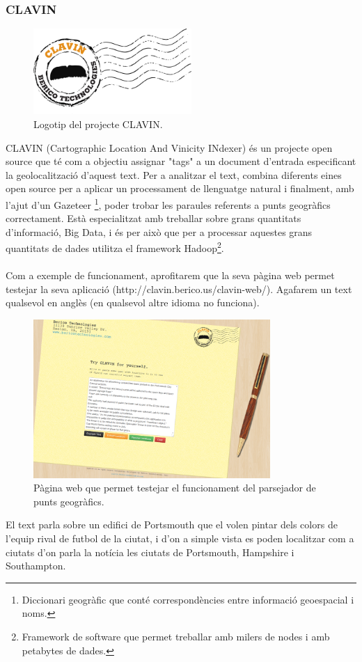 \documentclass[12pt,a4paper,openright,oneside]{article}
\numberwithin{equation}{section}
\theoremstyle{definition}
\begin{document}
\subsubsection*{CLAVIN}
\begin{figure}[htbp]
\centering
\includegraphics[width=6cm]{clavin.png}
\caption{Logotip del projecte CLAVIN.}
\end{figure}
CLAVIN (Cartographic Location And Vinicity INdexer) és un projecte open source que té com a objectiu assignar "tags" a un document d'entrada especificant la geolocalització d'aquest text. Per a analitzar el text, combina diferents eines open source per a aplicar un processament de llenguatge natural i finalment, amb l'ajut d'un Gazeteer
\footnote{Diccionari geogràfic que conté correspondències entre informació geoespacial i noms.},
 poder trobar les paraules referents a punts geogràfics correctament. Està especialitzat amb treballar sobre grans quantitats d'informació, Big Data, i és per això que per a processar aquestes grans quantitats de dades utilitza el framework Hadoop\footnote{Framework de software que permet treballar amb milers de nodes i amb petabytes de dades.}.\\\\
Com a exemple de funcionament, aprofitarem que la seva pàgina web permet testejar la seva aplicació (http://clavin.berico.us/clavin-web/). Agafarem un text qualsevol en anglès (en qualsevol altre idioma no funciona).\\
\newpage
\begin{figure}[!htbp]
\centering
\includegraphics[width=9cm]{clavin-1.png}
\caption{Pàgina web que permet testejar el funcionament del parsejador de punts geogràfics.\cite{clavin}}
\end{figure}
El text parla sobre un edifici de Portsmouth que el volen pintar dels colors de l'equip rival de futbol de la ciutat, i d'on a simple vista es poden localitzar com a ciutats d'on parla la notícia les ciutats de Portsmouth, Hampshire i Southampton.
\end{document}
